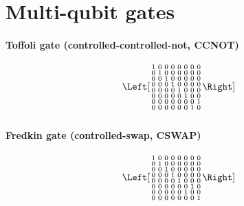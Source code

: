 \documentclass[article,pagebackref]{bespoke5}
\begin{document}
\section{Multi-qubit gates}

\paragraph{Toffoli gate (controlled-controlled-not, CCNOT)}
\[
\Left[ \begin{smallmatrix}
 1 & 0 & 0 & 0 & 0 & 0 & 0 & 0 \\
 0 & 1 & 0 & 0 & 0 & 0 & 0 & 0 \\
 0 & 0 & 1 & 0 & 0 & 0 & 0 & 0 \\
 0 & 0 & 0 & 1 & 0 & 0 & 0 & 0 \\
 0 & 0 & 0 & 0 & 1 & 0 & 0 & 0 \\
 0 & 0 & 0 & 0 & 0 & 1 & 0 & 0 \\
 0 & 0 & 0 & 0 & 0 & 0 & 0 & 1 \\
 0 & 0 & 0 & 0 & 0 & 0 & 1 & 0 \\
\end{smallmatrix} \Right]
\]
$$

$$


\paragraph{Fredkin gate (controlled-swap, CSWAP)}
\[
\Left[ \begin{smallmatrix}
 1 & 0 & 0 & 0 & 0 & 0 & 0 & 0 \\
 0 & 1 & 0 & 0 & 0 & 0 & 0 & 0 \\
 0 & 0 & 1 & 0 & 0 & 0 & 0 & 0 \\
 0 & 0 & 0 & 1 & 0 & 0 & 0 & 0 \\
 0 & 0 & 0 & 0 & 1 & 0 & 0 & 0 \\
 0 & 0 & 0 & 0 & 0 & 0 & 1 & 0 \\
 0 & 0 & 0 & 0 & 0 & 1 & 0 & 0 \\
 0 & 0 & 0 & 0 & 0 & 0 & 0 & 1 \\
\end{smallmatrix} \Right]
\]

$$

$$





\end{document}
